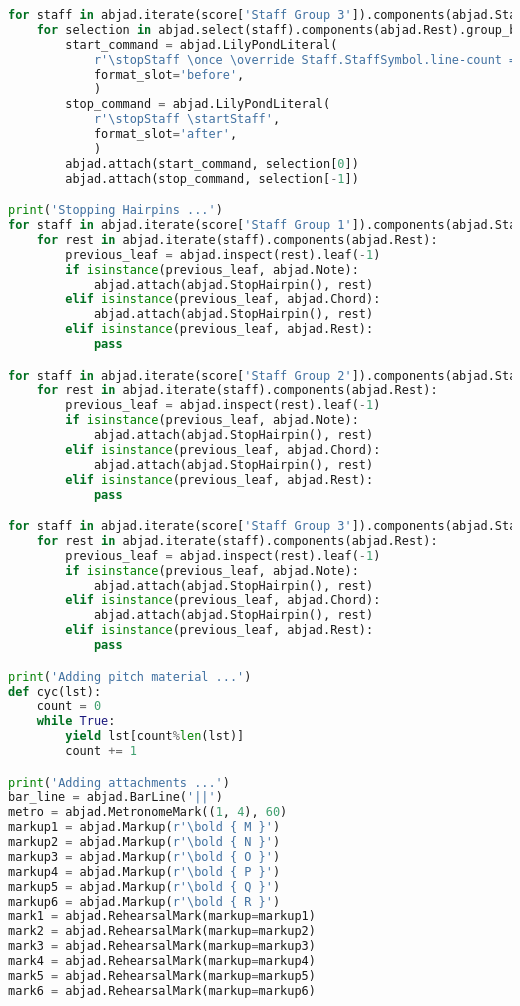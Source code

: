\begin{lstlisting}[language=Python, caption=Tianshu Segment\_III]
for staff in abjad.iterate(score['Staff Group 3']).components(abjad.Staff):
    for selection in abjad.select(staff).components(abjad.Rest).group_by_contiguity():
        start_command = abjad.LilyPondLiteral(
            r'\stopStaff \once \override Staff.StaffSymbol.line-count = #1 \startStaff',
            format_slot='before',
            )
        stop_command = abjad.LilyPondLiteral(
            r'\stopStaff \startStaff',
            format_slot='after',
            )
        abjad.attach(start_command, selection[0])
        abjad.attach(stop_command, selection[-1])

print('Stopping Hairpins ...')
for staff in abjad.iterate(score['Staff Group 1']).components(abjad.Staff):
    for rest in abjad.iterate(staff).components(abjad.Rest):
        previous_leaf = abjad.inspect(rest).leaf(-1)
        if isinstance(previous_leaf, abjad.Note):
            abjad.attach(abjad.StopHairpin(), rest)
        elif isinstance(previous_leaf, abjad.Chord):
            abjad.attach(abjad.StopHairpin(), rest)
        elif isinstance(previous_leaf, abjad.Rest):
            pass

for staff in abjad.iterate(score['Staff Group 2']).components(abjad.Staff):
    for rest in abjad.iterate(staff).components(abjad.Rest):
        previous_leaf = abjad.inspect(rest).leaf(-1)
        if isinstance(previous_leaf, abjad.Note):
            abjad.attach(abjad.StopHairpin(), rest)
        elif isinstance(previous_leaf, abjad.Chord):
            abjad.attach(abjad.StopHairpin(), rest)
        elif isinstance(previous_leaf, abjad.Rest):
            pass

for staff in abjad.iterate(score['Staff Group 3']).components(abjad.Staff):
    for rest in abjad.iterate(staff).components(abjad.Rest):
        previous_leaf = abjad.inspect(rest).leaf(-1)
        if isinstance(previous_leaf, abjad.Note):
            abjad.attach(abjad.StopHairpin(), rest)
        elif isinstance(previous_leaf, abjad.Chord):
            abjad.attach(abjad.StopHairpin(), rest)
        elif isinstance(previous_leaf, abjad.Rest):
            pass

print('Adding pitch material ...')
def cyc(lst):
    count = 0
    while True:
        yield lst[count%len(lst)]
        count += 1

print('Adding attachments ...')
bar_line = abjad.BarLine('||')
metro = abjad.MetronomeMark((1, 4), 60)
markup1 = abjad.Markup(r'\bold { M }')
markup2 = abjad.Markup(r'\bold { N }')
markup3 = abjad.Markup(r'\bold { O }')
markup4 = abjad.Markup(r'\bold { P }')
markup5 = abjad.Markup(r'\bold { Q }')
markup6 = abjad.Markup(r'\bold { R }')
mark1 = abjad.RehearsalMark(markup=markup1)
mark2 = abjad.RehearsalMark(markup=markup2)
mark3 = abjad.RehearsalMark(markup=markup3)
mark4 = abjad.RehearsalMark(markup=markup4)
mark5 = abjad.RehearsalMark(markup=markup5)
mark6 = abjad.RehearsalMark(markup=markup6)


\end{lstlisting}
